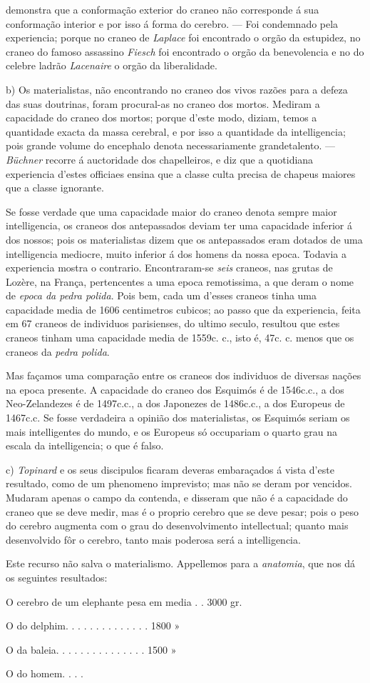 demonstra que a conformação exterior do craneo não corresponde á sua conformação interior e por isso á forma do cerebro. --- Foi condemnado pela experiencia; porque no craneo de \emph{Laplace} foi encontrado o orgão da estupidez, no craneo do famoso assassino \emph{Fiesch} foi encontrado o orgão da benevolencia e no do celebre ladrão \emph{Lacenaire} o orgão da liberalidade.\par b) Os materialistas, não encontrando no craneo dos vivos razões para a defeza das suas doutrinas, foram procural-as no craneo dos mortos. Mediram a capacidade do craneo dos mortos; porque d'este modo, diziam, temos a quantidade exacta da massa cerebral, e por isso a quantidade da intelligencia; pois grande volume do encephalo denota necessariamente grandetalento. --- \emph{Büchner} recorre á auctoridade dos chapelleiros, e diz que a quotidiana experiencia d'estes officiaes ensina que a classe culta precisa de chapeus maiores que a classe ignorante.\par Se fosse verdade que uma capacidade maior do craneo denota sempre maior intelligencia, os craneos dos antepassados deviam ter uma capacidade inferior á dos nossos; pois os materialistas dizem que os antepassados eram dotados de uma intelligencia mediocre, muito inferior á dos homens da nossa epoca. Todavia a experiencia mostra o contrario. Encontraram-se \emph{seis} craneos, nas grutas de Lozère, na França, pertencentes a uma epoca remotissima, a que deram o nome de \emph{epoca da pedra polida}. Pois bem, cada um d'esses craneos tinha uma capacidade media de 1606 centimetros cubicos; ao passo que da experiencia, feita em 67 craneos de individuos parisienses, do ultimo seculo, resultou que estes craneos tinham uma capacidade media de 1559c. c., isto é, 47c. c. menos que os craneos da \emph{pedra polida}.\par Mas façamos uma comparação entre os craneos dos individuos de diversas nações na epoca presente. A capacidade do craneo dos Esquimós é de 1546c.c., a dos Neo-Zelandezes é de 1497c.c., a dos Japonezes de 1486c.c., a dos Europeus de 1467c.c. Se fosse verdadeira a opinião dos materialistas, os Esquimós seriam os mais intelligentes do mundo, e os Europeus só occupariam o quarto grau na escala da intelligencia; o que é falso.\par c) \emph{Topinard} e os seus discipulos ficaram deveras embaraçados á vista d'este resultado, como de um phenomeno imprevisto; mas não se deram por vencidos. Mudaram apenas o campo da contenda, e disseram que não é a capacidade do craneo que se deve medir, mas é o proprio cerebro que se deve pesar; pois o peso do cerebro augmenta com o grau do desenvolvimento intellectual; quanto mais desenvolvido fôr o cerebro, tanto mais poderosa será a intelligencia.\par Este recurso não salva o materialismo. Appellemos para a \emph{anatomia}, que nos dá os seguintes resultados:\par O cerebro de um elephante pesa em media . . 3000 gr.\par O do delphim. . . . . . . . . . . . . . 1800 »\par O da baleia. . . . . . . . . . . . . . . 1500 »\par O do homem. . . . 